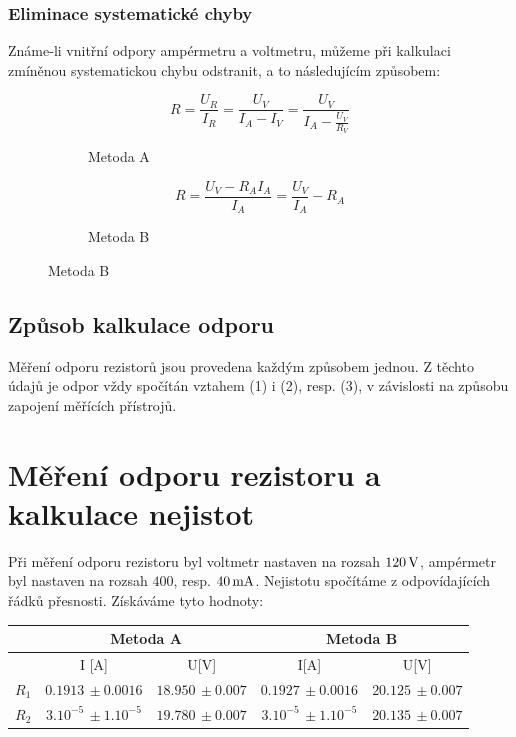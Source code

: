 \documentclass[czech,11pt,a4paper]{article}
\begin{document}
   \subsubsection{Eliminace systematické chyby}
   Známe-li vnitřní odpory ampérmetru a voltmetru, můžeme při kalkulaci zmíněnou systematickou chybu odstranit, a to následujícím způsobem:
    \begin{figure}[h]
   	
   	\begin{subfigure}{0.5\textwidth}
   		\begin{center}
   			\begin{equation}
   					R = \frac{U_R}{I_R}=\frac{U_V}{I_A-I_V}= \frac{U_V}{I_A - \frac{U_V}{R_V}}
   			\end{equation}
   		\end{center}
   		\caption{Metoda A}
   	\end{subfigure}
   	\begin{subfigure}{0.5\textwidth}
   	\begin{center}
   	\begin{equation}
   			R = \frac{U_V - R_AI_A}{I_A} = \frac{U_V}{I_A}- R_A 
   		\end{equation}
   	\end{center}
   		\caption{Metoda B}
   	\end{subfigure}
   	 \end{figure}
   	 
   	 \subsection{Způsob kalkulace odporu}
	Měření odporu rezistorů jsou provedena každým způsobem jednou. Z těchto údajů je odpor vždy spočítán vztahem (1) i (2), resp. (3), v závislosti na způsobu zapojení měřících přístrojů.
	
	
	\section{Měření odporu rezistoru a kalkulace nejistot}
	Při měření odporu rezistoru byl voltmetr nastaven na rozsah $120\,\rm V$, ampérmetr byl nastaven na rozsah $400$, resp. $40 \,\rm mA$. Nejistotu spočítáme z odpovídajících řádků přesnosti. Získáváme tyto hodnoty: \\
	
	\begin{center}
		\begin{tabular}{||c|c|c|c|c||}
		\hline
		&   \multicolumn{2}{|c|}{Metoda A} & \multicolumn{2}{|c||}{Metoda B}  \\
		\hline
		& I [A] & U[V] & I[A] & U[V] \\
		\hline
		$R_1$ & $0.1913 \, \pm 0.0016 $ & $18.950\, \pm 0.007$ & $0.1927 \,\pm 0.0016$ & $ 20.125 \,\pm 0.007$ \\
		\hline
		$R_2$ &$ 3.10^{-5} \,\pm 1.10^{-5} $& $19.780 \,\pm 0.007$ & $3.10^{-5} \,\pm 1.10^{-5}$ & $20.135 \,\pm 0.007$ \\
		\hline
	\end{tabular}
	\end{center}
	
\end{document}
